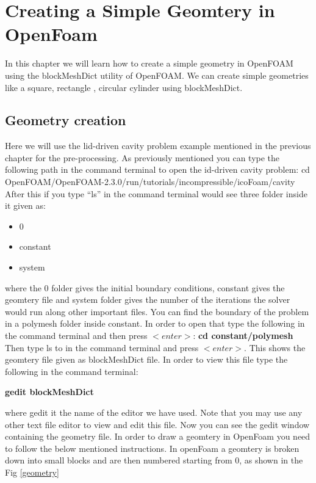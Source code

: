 \chapter{Creating a Simple Geomtery in OpenFoam}
\thispagestyle{empty}
\label{sec:chap2}
\newcommand{\LocCHtwofig}{\Origin/CHAPTERS/chap2/figures}

In this chapter we will learn how to create a simple geometry in OpenFOAM using the blockMeshDict utility of OpenFOAM. We can create simple geometries
like a square, rectangle , circular cylinder using blockMeshDict.

\section{Geometry creation}
Here we will use the lid-driven cavity problem example mentioned in the previous chapter for the pre-processing. As previously mentioned you can type the following path in the command terminal to open the id-driven cavity problem:
\small{cd OpenFOAM/OpenFOAM-2.3.0/run/tutorials/incompressible/icoFoam/cavity}\newline
\flushleft After this if you type “ls” in the command terminal would see three folder inside it given as:

\begin{itemize}
\item 0
\item constant
\item system
\end{itemize}

\flushleft where the 0 folder gives the initial boundary conditions, constant gives the geomtery file and system folder gives the number of the iterations the solver would run along other important files. You can find the boundary of the problem in a polymesh folder inside constant. In order to open that type the following in the command terminal and then press $<enter>$:
\center \textbf{cd constant/polymesh}
\flushleft Then type ls to in the command terminal and press $<enter>$. This shows the geomtery file given as blockMeshDict file. In order to view this file type the following in the command terminal:

\center \textbf{gedit blockMeshDict}

\flushleft where gedit it the name of the editor we have used. Note that you may use any other text file editor to view and edit this file.
\flushleft Now you can see the gedit window containing the geometry file. In order to draw a geomtery in OpenFoam you need to follow the below mentioned instructions.
\flushleft In openFoam a geomtery is broken down into small blocks and are then numbered starting from 0, as shown in the Fig \ref{geometry}

